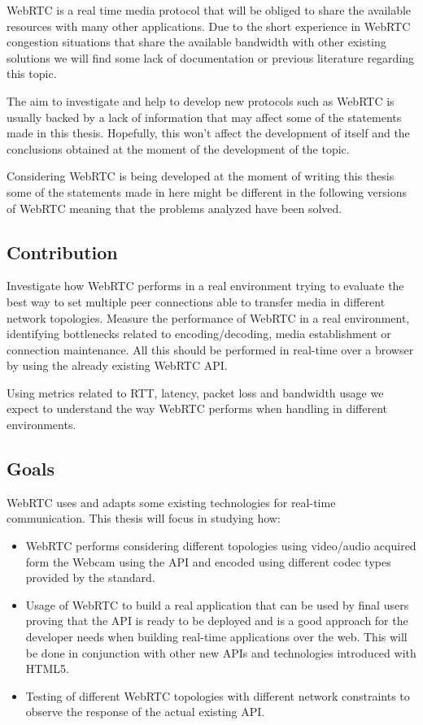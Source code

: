 WebRTC is a real time media protocol that will be obliged to share the available resources with many other applications. Due to the short experience in WebRTC congestion situations that share the available bandwidth with other existing solutions we will find some lack of documentation or previous literature regarding this topic. 

The aim to investigate and help to develop new protocols such as WebRTC is usually backed by a lack of information that may affect some of the statements made in this thesis. Hopefully, this won't affect the development of itself and the conclusions obtained at the moment of the development of the topic. 

Considering WebRTC is being developed at the moment of writing this thesis some of the statements made in here might be different in the following versions of WebRTC meaning that the problems analyzed have been solved.

\subsection{Contribution}

Investigate how WebRTC performs in a real environment trying to evaluate the best way to set multiple peer connections able to transfer media in different network topologies. Measure the performance of WebRTC in a real environment, identifying bottlenecks related to encoding/decoding, media establishment or connection maintenance. All this should be performed in real-time over a browser by using the already existing WebRTC API.

Using metrics related to RTT, latency, packet loss and bandwidth usage we expect to understand the way WebRTC performs when handling in different environments.

\subsection{Goals}

WebRTC uses and adapts some existing technologies for real-time communication. This thesis will focus in studying how:

\begin{itemize}
	\item WebRTC performs considering different topologies using video/audio acquired form the Webcam using the API and encoded using different codec types provided by the standard.

	\item Usage of WebRTC to build a real application that can be used by final users proving that the API is ready to be deployed and is a good approach for the developer needs when building real-time applications over the web. This will be done in conjunction with other new APIs and technologies introduced with HTML5.
	
	\item Testing of different WebRTC topologies with different network constraints to observe the response of the actual existing API.
\end{itemize}

